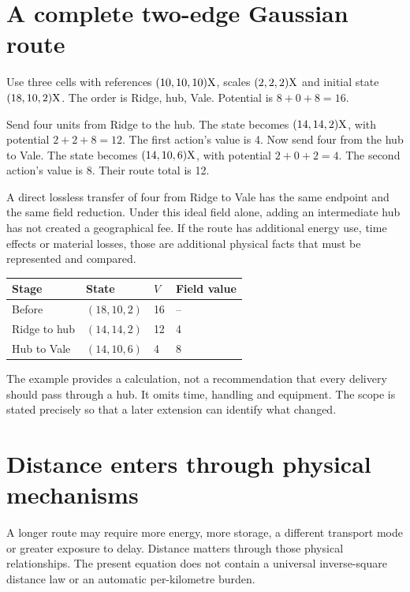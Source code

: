 \section{A complete two-edge Gaussian route}
Use three cells with references $(10,10,10)\mathrm{X}$, scales $(2,2,2)\mathrm{X}$ and initial state $(18,10,2)\mathrm{X}$. The order is Ridge, hub, Vale. Potential is $8+0+8=16$.

Send four units from Ridge to the hub. The state becomes $(14,14,2)\mathrm{X}$, with potential $2+2+8=12$. The first action's value is 4. Now send four from the hub to Vale. The state becomes $(14,10,6)\mathrm{X}$, with potential $2+0+2=4$. The second action's value is 8. Their route total is 12.

A direct lossless transfer of four from Ridge to Vale has the same endpoint and the same field reduction. Under this ideal field alone, adding an intermediate hub has not created a geographical fee. If the route has additional energy use, time effects or material losses, those are additional physical facts that must be represented and compared.

\begin{center}
\begin{tabular}{llll}\toprule
Stage & State & $V$ & Field value\\\midrule
Before & $(18,10,2)$ & 16 & --\\
Ridge to hub & $(14,14,2)$ & 12 & 4\\
Hub to Vale & $(14,10,6)$ & 4 & 8\\\bottomrule
\end{tabular}
\end{center}

The example provides a calculation, not a recommendation that every delivery should pass through a hub. It omits time, handling and equipment. The scope is stated precisely so that a later extension can identify what changed.


\section{Distance enters through physical mechanisms}
A longer route may require more energy, more storage, a different transport mode or greater exposure to delay. Distance matters through those physical relationships. The present equation does not contain a universal inverse-square distance law or an automatic per-kilometre burden.


